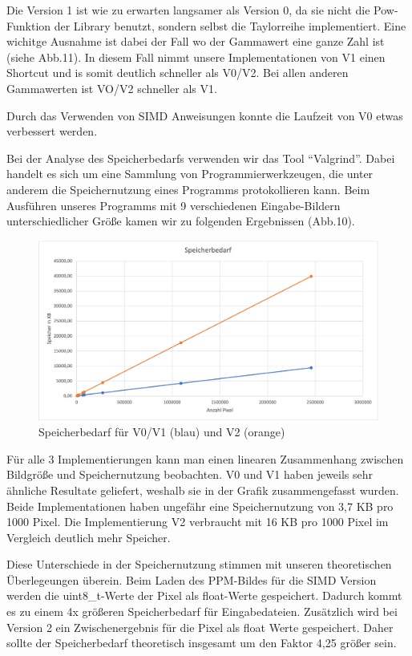 \documentclass[course=erap]{aspdoc}
\begin{document}
\par
Die Version 1 ist wie zu erwarten langsamer als Version 0, da sie nicht die Pow-Funktion der Library benutzt, sondern selbst die Taylorreihe implementiert. Eine wichitge Ausnahme ist dabei der Fall wo der Gammawert eine ganze Zahl ist (siehe Abb.11). In diesem Fall nimmt unsere Implementationen von V1 einen Shortcut und is somit deutlich schneller als V0/V2. Bei allen anderen Gammawerten ist VO/V2 schneller als V1. 

\par
Durch das Verwenden von SIMD Anweisungen konnte die Laufzeit von V0 etwas verbessert werden.

\par
Bei der Analyse des Speicherbedarfs verwenden wir das Tool “Valgrind”. Dabei handelt es sich um eine Sammlung von Programmierwerkzeugen, die unter anderem die Speichernutzung eines Programms protokollieren kann. Beim Ausführen unseres Programms mit 9 verschiedenen Eingabe-Bildern unterschiedlicher Größe kamen wir zu folgenden Ergebnissen (Abb.10).

\begin{figure}[h]
\centering
\includegraphics[width=1\textwidth]{Bilder/Speicherbedarf2.png}
\caption{Speicherbedarf für V0/V1 (blau) und V2 (orange)}
\end{figure}

\par
Für alle 3 Implementierungen kann man einen linearen Zusammenhang zwischen Bildgröße und Speichernutzung beobachten. V0 und V1 haben jeweils sehr ähnliche Resultate geliefert, weshalb sie in der Grafik zusammengefasst wurden. Beide Implementationen haben ungefähr eine Speichernutzung von 3,7 KB pro 1000 Pixel. Die Implementierung V2 verbraucht mit 16 KB pro 1000 Pixel im Vergleich deutlich mehr Speicher.

\par
Diese Unterschiede in der Speichernutzung stimmen mit unseren theoretischen Überlegeungen überein. Beim Laden des PPM-Bildes für die SIMD Version werden die uint8\_t-Werte der Pixel als float-Werte gespeichert. Dadurch kommt es zu einem 4x größeren Speicherbedarf für Eingabedateien. Zusätzlich wird bei Version 2 ein Zwischenergebnis für die Pixel als float Werte gespeichert. Daher sollte der Speicherbedarf theoretisch insgesamt um den Faktor 4,25 größer sein. 
\end{document}
